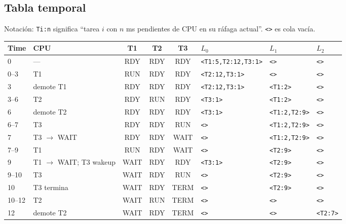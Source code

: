 \documentclass[11pt,a4paper]{article}
\begin{document}
\subsection*{Tabla temporal}

Notación: \texttt{Ti:n} significa ``tarea $i$ con $n$ ms pendientes
de CPU en su ráfaga actual''. \texttt{<>} es cola vacía.

\begin{center}
\scriptsize
\begin{tabular}{@{}llcccp{2.5cm}p{1.55cm}p{1.4cm}@{}}
\toprule
Time & CPU & T1 & T2 & T3 & $L_0$ & $L_1$ & $L_2$ \\
\midrule
0     & ---             & RDY  & RDY & RDY  & \texttt{<T1:5,T2:12,T3:1>} & \texttt{<>}        & \texttt{<>}      \\
0--3  & T1              & RUN  & RDY & RDY  & \texttt{<T2:12,T3:1>}      & \texttt{<>}        & \texttt{<>}      \\
3     & demote T1       & RDY  & RDY & RDY  & \texttt{<T2:12,T3:1>}      & \texttt{<T1:2>}    & \texttt{<>}      \\
3--6  & T2              & RDY  & RUN & RDY  & \texttt{<T3:1>}            & \texttt{<T1:2>}    & \texttt{<>}      \\
6     & demote T2       & RDY  & RDY & RDY  & \texttt{<T3:1>}            & \texttt{<T1:2,T2:9>} & \texttt{<>}    \\
6--7  & T3              & RDY  & RDY & RUN  & \texttt{<>}                & \texttt{<T1:2,T2:9>} & \texttt{<>}    \\
7     & T3 $\to$ WAIT   & RDY  & RDY & WAIT & \texttt{<>}                & \texttt{<T1:2,T2:9>} & \texttt{<>}    \\
7--9  & T1              & RUN  & RDY & WAIT & \texttt{<>}                & \texttt{<T2:9>}    & \texttt{<>}      \\
9     & T1 $\to$ WAIT; T3 wakeup & WAIT & RDY & RDY & \texttt{<T3:1>}    & \texttt{<T2:9>}    & \texttt{<>}      \\
9--10 & T3              & WAIT & RDY & RUN  & \texttt{<>}                & \texttt{<T2:9>}    & \texttt{<>}      \\
10    & T3 termina      & WAIT & RDY & TERM & \texttt{<>}                & \texttt{<T2:9>}    & \texttt{<>}      \\
10--12 & T2             & WAIT & RUN & TERM & \texttt{<>}                & \texttt{<>}        & \texttt{<>}      \\
12    & demote T2       & WAIT & RDY & TERM & \texttt{<>}                & \texttt{<>}        & \texttt{<T2:7>}  \\

\end{tabular}
\end{center}
\end{document}
